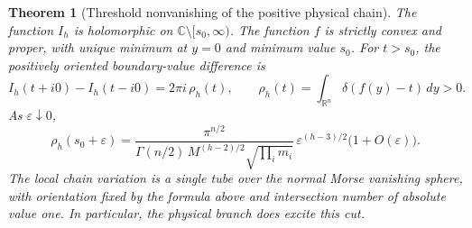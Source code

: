 \documentclass[11pt,a4paper,oneside]{article}
\theoremstyle{plain}
\newtheorem{theorem}{Theorem}[section]
\theoremstyle{definition}
\theoremstyle{remark}
\numberwithin{equation}{section}
\begin{document}
\begin{theorem}[Threshold nonvanishing of the positive physical chain]\label{unified:thm:threshold}
The function $I_h$ is holomorphic on $\mathbb C\setminus[s_0,\infty)$.
The function $f$ is strictly convex and proper, with unique minimum at $y=0$ and minimum value $s_0$.
For $t>s_0$, the positively oriented boundary-value difference is
\[
 I_h(t+i0)-I_h(t-i0)=2\pi i\,\rho_h(t),\qquad
 \rho_h(t)=\int_{\mathbb R^n}\delta(f(y)-t)\,dy>0.
\]
As $\varepsilon\downarrow0$,
\[
 \rho_h(s_0+\varepsilon)=
 \frac{\pi^{n/2}}
 {\Gamma(n/2)\,M^{(h-2)/2}\sqrt{\prod_i m_i}}\,
 \varepsilon^{(h-3)/2}\bigl(1+O(\varepsilon)\bigr).
 \tag{T}
\]
The local chain variation is a single tube over the normal Morse vanishing sphere, with orientation fixed by the formula above
and intersection number of absolute value one. In particular, the physical branch does excite this cut.
\end{theorem}
\end{document}
